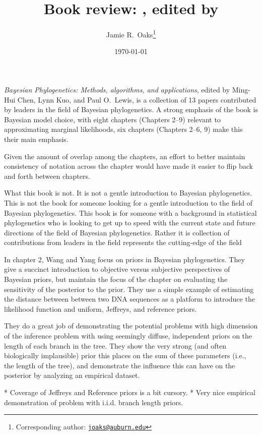 \documentclass[letterpaper,12pt]{article}
\title{Book review: \bookfulltitle, edited by \editors}
\author[1,2]{Jamie R.\ Oaks\thanks{Corresponding author: \href{mailto:joaks@auburn.edu}{\tt joaks@auburn.edu}}}
\affil[1]{Department of Biology, University of Washington, Seattle, Washington 98195}
\affil[2]{Department of Biological Sciences, Auburn University, Auburn, Alabama 36849}
\date{\today}
\newcommand{\booktitle}{\textit{Bayesian Phylogenetics}\xspace}
\newcommand{\booksubtitle}{\textit{Methods, algorithms, and applications}\xspace}
\newcommand{\bookfulltitle}{\textit{\booktitle: \booksubtitle}\xspace}
\newcommand{\editors}{Ming-Hui Chen, Lynn Kuo, and Paul O.\ Lewis\xspace}
\begin{document}
\maketitle

\newpage
\doublespacing

\bookfulltitle, edited by \editors \citep{Chen2014}, is a collection of 13
papers contributed by leaders in the field of Bayesian phylogenetics.
A strong emphasis of the book is Bayesian model choice, with eight chapters
(Chapters 2--9) relevant to approximating marginal likelihoods,
six chapters (Chapters 2--6, 9) make this their main emphasis.

Given the amount of overlap among the chapters, an effort to better maintain
consistency of notation across the chapter would have made it easier to flip
back and forth between chapters.

What this book is not.
It is not a gentle introduction to Bayesian phylogenetics.
This is not the book for someone looking for a gentle introduction
to the field of Bayesian phylogenetics.
This book is for someone with a background in statistical phylogenetics
who is looking to get up to speed with the current state and future directions
of the field of Bayesian phylogenetics.
Rather it is collection of contributions from leaders in the field
represents the cutting-edge of the field

In chapter 2, Wang and Yang focus on priors in Bayesian phylogenetics.
They give a succinct introduction to objective versus subjective perspectives
of Bayesian priors, but maintain the focus of the chapter on evaluating
the sensitivity of the posterior to the prior.
They use a simple example of estimating the distance between between
two DNA sequences as a platform to introduce the likelihood function
and uniform, Jeffreys, and reference priors.

They do a great job of demonstrating the potential problems
with high dimension of the inference problem
with
using seemingly diffuse, independent priors on the length
of each branch in the tree.
They show the very strong (and often biologically implausible) prior
this places on the sum of these parameters (i.e., the length of the tree),
and demonstrate the influence this can have on the posterior by
analyzing an empirical dataset.

*   Coverage of Jeffreys and Reference priors is a bit cursory.
*   Very nice empirical demonstration of problem with i.i.d. branch length
    priors.
\end{document}
